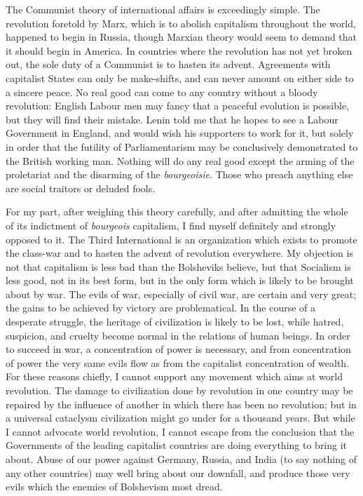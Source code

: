 The Communist theory of international affairs is exceedingly simple. The revolution foretold by Marx, which is to abolish capitalism throughout the world, happened to begin in Russia, though Marxian theory would seem to demand that it should begin in America. In countries where the revolution has not yet broken out, the sole duty of a Communist is to hasten its advent. Agreements with capitalist States can only be make-shifts, and can never amount on either side to a sincere peace. No real good can come to any country without a bloody revolution: English Labour men may fancy that a peaceful evolution is possible, but they will find their mistake. Lenin told me that he hopes to see a Labour Government in England, and would wish his supporters to work for it, but solely in order that the futility of Parliamentarism may be conclusively demonstrated to the British working man. Nothing will do any real good except the arming of the proletariat and the disarming of the \emph{bourgeoisie}. Those who preach anything else are social traitors or deluded fools.

For my part, after weighing this theory carefully, and after admitting the whole of its indictment of \emph{bourgeois} capitalism, I find myself definitely and strongly opposed to it. The Third International is an organization which exists to promote the class-war and to hasten the advent of revolution everywhere. My objection is not that capitalism is less bad than the Bolsheviks believe, but that Socialism is less good, not in its best form, but in the only form which is likely to be brought about by war. The evils of war, especially of civil war, are certain and very great; the gains to be achieved by victory are problematical. In the course of a desperate struggle, the heritage of civilization is likely to be lost, while hatred, suspicion, and cruelty become normal in the relations of human beings. In order to succeed in war, a concentration of power is necessary, and from concentration of power the very same evils flow as from the capitalist concentration of wealth. For these reasons chiefly, I cannot support any movement which aims at world revolution. The damage to civilization done by revolution in one country may be repaired by the influence of another in which there has been no revolution; but in a universal cataclysm civilization might go under for a thousand years. But while I cannot advocate world revolution, I cannot escape from the conclusion that the Governments of the leading capitalist countries are doing everything to bring it about. Abuse of our power against Germany, Russia, and India (to say nothing of any other countries) may well bring about our downfall, and produce those very evils which the enemies of Bolshevism most dread.

